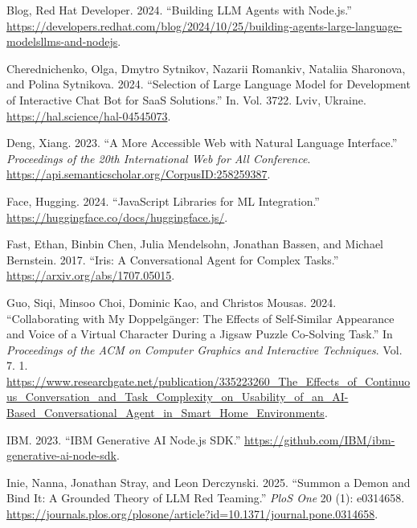 \documentclass[
]{article}
\newlength{\cslhangindent}
\newenvironment{CSLReferences}[2] %
 {\begin{list}{}{%
  \setlength{\itemindent}{0pt}
  \setlength{\leftmargin}{0pt}
  \setlength{\parsep}{0pt}
  \ifodd #1
   \setlength{\leftmargin}{\cslhangindent}
   \setlength{\itemindent}{-1\cslhangindent}
  \fi
  \setlength{\itemsep}{#2\baselineskip}}}
 {\end{list}}
\begin{document}
\label{refs}
\begin{CSLReferences}{1}{0}
Blog, Red Hat Developer. 2024. {``Building LLM Agents with Node.js.''}
\url{https://developers.redhat.com/blog/2024/10/25/building-agents-large-language-modelsllms-and-nodejs}.

Cherednichenko, Olga, Dmytro Sytnikov, Nazarii Romankiv, Nataliia
Sharonova, and Polina Sytnikova. 2024. {``Selection of Large Language
Model for Development of Interactive Chat Bot for SaaS Solutions.''} In.
Vol. 3722. Lviv, Ukraine. \url{https://hal.science/hal-04545073}.

Deng, Xiang. 2023. {``A More Accessible Web with Natural Language
Interface.''} \emph{Proceedings of the 20th International Web for All
Conference}. \url{https://api.semanticscholar.org/CorpusID:258259387}.

Face, Hugging. 2024. {``JavaScript Libraries for ML Integration.''}
\url{https://huggingface.co/docs/huggingface.js/}.

Fast, Ethan, Binbin Chen, Julia Mendelsohn, Jonathan Bassen, and Michael
Bernstein. 2017. {``Iris: A Conversational Agent for Complex Tasks.''}
\url{https://arxiv.org/abs/1707.05015}.

Guo, Siqi, Minsoo Choi, Dominic Kao, and Christos Mousas. 2024.
{``Collaborating with My Doppelgänger: The Effects of Self-Similar
Appearance and Voice of a Virtual Character During a Jigsaw Puzzle
Co-Solving Task.''} In \emph{Proceedings of the ACM on Computer Graphics
and Interactive Techniques}. Vol. 7. 1.
\url{https://www.researchgate.net/publication/335223260_The_Effects_of_Continuous_Conversation_and_Task_Complexity_on_Usability_of_an_AI-Based_Conversational_Agent_in_Smart_Home_Environments}.

IBM. 2023. {``IBM Generative AI Node.js SDK.''}
\url{https://github.com/IBM/ibm-generative-ai-node-sdk}.

Inie, Nanna, Jonathan Stray, and Leon Derczynski. 2025. {``Summon a
Demon and Bind It: A Grounded Theory of LLM Red Teaming.''} \emph{PloS
One} 20 (1): e0314658.
\url{https://journals.plos.org/plosone/article?id=10.1371/journal.pone.0314658}.


\end{CSLReferences}
\end{document}
